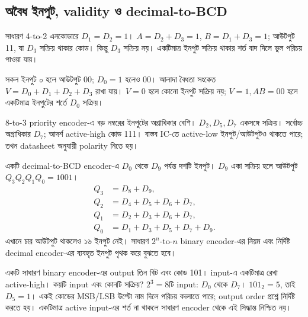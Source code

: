 \subsection{অবৈধ ইনপুট, validity ও decimal-to-BCD}
সাধারণ 4-to-2 এনকোডারে $D_1=D_2=1$।
\chThreeAnswer $A=D_2+D_3=1$, $B=D_1+D_3=1$; আউটপুট 11, যা $D_3$ সক্রিয় থাকার কোড। কিন্তু $D_3$ সক্রিয় নয়। একটিমাত্র ইনপুট সক্রিয় থাকার শর্ত বাদ দিলে ভুল পরিচয় পাওয়া যায়।

সকল ইনপুট ০ হলে আউটপুট 00; $D_0=1$ হলেও 00।
\chThreeAnswer আলাদা বৈধতা সংকেত $V=D_0+D_1+D_2+D_3$ রাখা যায়। $V=0$ হলে কোনো ইনপুট সক্রিয় নয়; $V=1,AB=00$ হলে একটিমাত্র ইনপুটের শর্তে $D_0$ সক্রিয়।

8-to-3 priority encoder-এ বড় নম্বরের ইনপুটের অগ্রাধিকার বেশি। $D_2,D_5,D_7$ একসঙ্গে সক্রিয়।
\chThreeAnswer সর্বোচ্চ অগ্রাধিকার $D_7$; আদর্শ active-high কোড 111। বাস্তব IC-তে active-low ইনপুট/আউটপুটও থাকতে পারে; তখন datasheet অনুযায়ী polarity নিতে হয়।

একটি decimal-to-BCD encoder-এ $D_0$ থেকে $D_9$ পর্যন্ত দশটি ইনপুট। $D_9$ একা সক্রিয় হলে আউটপুট $Q_3Q_2Q_1Q_0=1001$।
\chThreeAnswer
\[\begin{aligned}Q_3&=D_8+D_9,\\Q_2&=D_4+D_5+D_6+D_7,\\Q_1&=D_2+D_3+D_6+D_7,\\Q_0&=D_1+D_3+D_5+D_7+D_9.\end{aligned}\]
এখানে চার আউটপুট থাকলেও ১৬ ইনপুট নেই। সাধারণ $2^n$-to-$n$ binary encoder-এর নিয়ম এবং নির্দিষ্ট decimal encoder-এর ব্যবহৃত ইনপুট পৃথক করে বুঝতে হবে।

একটি সাধারণ binary encoder-এর output তিন বিট এবং কোড 101। input-এ একটিমাত্র রেখা active-high। কয়টি input এবং কোনটি সক্রিয়?
\chThreeAnswer $2^3=8$টি input: $D_0$ থেকে $D_7$। $101_2=5$, তাই $D_5=1$। একই কোডের MSB/LSB উল্টো নাম দিলে পরিচয় বদলাতে পারে; output order প্রশ্নে নির্দিষ্ট করতে হয়। একটিমাত্র active input-এর শর্ত না থাকলে সাধারণ encoder থেকে এই সিদ্ধান্ত নিশ্চিত নয়।
